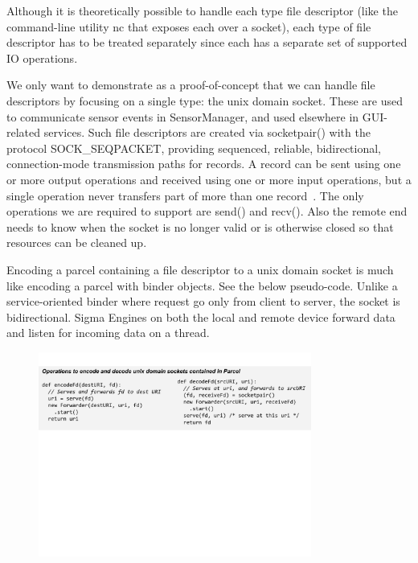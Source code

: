 \documentclass[prodmode]{acmlarge}
\begin{document}
Although it is theoretically possible to handle each type file descriptor (like the command-line utility nc that exposes each over a socket), each type of file descriptor has to be treated separately since each has a separate set of supported IO operations.

We only want to demonstrate as a proof-of-concept that we can handle file descriptors by focusing on a single type: the unix domain socket. These are used to communicate sensor events in SensorManager, and used elsewhere in GUI-related services. Such file descriptors are created via socketpair() with the protocol SOCK\_SEQPACKET, providing sequenced, reliable, bidirectional, connection-mode transmission paths for records. A record can be sent using one or more output operations and received using one or more input operations, but a single operation never transfers part of more than one record~\cite{SocketManPage}. The only operations we are required to support are send() and recv(). Also the remote end needs to know when the socket is no longer valid or is otherwise closed so that resources can be cleaned up.

Encoding a parcel containing a file descriptor to a unix domain socket is much like encoding a parcel with binder objects. See the below pseudo-code. Unlike a service-oriented binder where request go only from client to server, the socket is bidirectional. Sigma Engines on both the local and remote device forward data and listen for incoming data on a thread.
\begin{figure}[h]
\centering
\includegraphics[width=0.8\textwidth]{drawings/encodeFds.pdf}
\end{figure}
\end{document}
